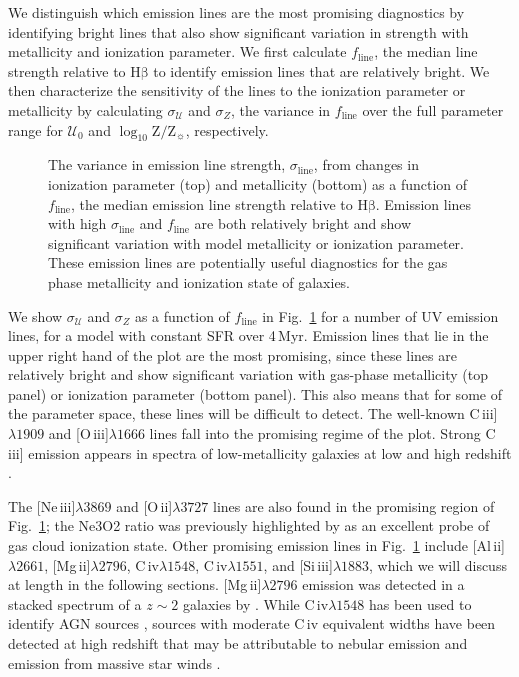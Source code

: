 \documentclass[preprint2]{aastex61}
\newcommand{\oiii}{[O\,{\sc iii}]\xspace}
\newcommand{\oii}{[O\,{\sc ii}]\xspace}
\newcommand{\neiii}{[Ne\,{\sc iii}]\xspace}
\newcommand{\civ}{C\,{\sc iv}\xspace}
\newcommand{\SiuIII}{[Si\,{\sc iii}]\xspace}
\newcommand{\alII}{[Al\,{\sc ii}]\xspace}
\newcommand{\mgii}{[Mg\,{\sc ii}]\xspace}
\newcommand{\ciii}{C\,{\sc iii}]\xspace}
\newcommand{\sigmaL}{\ensuremath{\sigma_{\mathrm{line}}}\xspace}
\newcommand{\sigmaU}{\ensuremath{\sigma_{\mathcal{U}}}\xspace}
\newcommand{\sigmaZ}{\ensuremath{\sigma_{Z}}\xspace}
\newcommand{\femline}{\ensuremath{f_{\mathrm{line}}}\xspace}
\newcommand{\hb}{\ensuremath{\mathrm{H\beta}}\xspace}
\newcommand{\Myr}{$\,$Myr\xspace}
\newcommand{\logten}{\ensuremath{\log_{10}}}
\newcommand{\logz}{\ensuremath{\logten \mathrm{Z}/\mathrm{Z}_{\sun}}\xspace}
\newcommand{\U}{\ensuremath{\mathcal{U}_{0}}\xspace}
\begin{document}
We distinguish which emission lines are the most promising diagnostics by identifying bright lines that also show significant variation in strength with metallicity and ionization parameter. We first calculate \femline, the median line strength relative to \hb to identify emission lines that are relatively bright. 
We then characterize the sensitivity of the lines to the ionization parameter or metallicity by calculating \sigmaU and \sigmaZ, the variance in \femline over the full parameter range for \U and \logz, respectively. 
\begin{figure}
  \begin{center}
    \caption{The variance in emission line strength, \sigmaL, from changes in ionization parameter (top) and metallicity (bottom) as a function of \femline, the median emission line strength relative to \hb. Emission lines with high \sigmaL and \femline are both relatively bright and show significant variation with model metallicity or ionization parameter. These emission lines are potentially useful diagnostics for the gas phase metallicity and ionization state of galaxies.}
    \label{fig:sigmaV}
  \end{center}
\end{figure}


We show \sigmaU and \sigmaZ as a function of \femline in Fig.~\ref{fig:sigmaV} for a number of UV emission lines, for a model with constant SFR over 4\Myr. Emission lines that lie in the upper right hand of the plot are the most promising, since these lines are relatively bright and show significant variation with gas-phase metallicity (top panel) or ionization parameter (bottom panel). This also means that for some of the parameter space, these lines will be difficult to detect. The well-known \ciii$\lambda1909$ and \oiii$\lambda1666$ lines fall into the promising regime of the plot. Strong \ciii emission appears in spectra of low-metallicity galaxies at low and high redshift \citep[e.g.,][]{Shapley+2003, Erb+2010, Leitherer+2011, Bayliss+2014, Stark+2014, Stark+2015, Berg+2016, Senchyna+2017, Stroe+2017a}.

The \neiii$\lambda3869$ and \oii$\lambda3727$ lines are also found in the promising region of Fig.~\ref{fig:sigmaV}; the Ne3O2 ratio was previously highlighted by \citet{Levesque+2014} as an excellent probe of gas cloud ionization state. Other promising emission lines in Fig.~\ref{fig:sigmaV} include \alII$\lambda2661$, \mgii$\lambda2796$, \civ$\lambda1548$, \civ$\lambda1551$, and \SiuIII$\lambda1883$, which we will discuss at length in the following sections. \mgii$\lambda2796$ emission was detected in a stacked spectrum of a $z{\sim}2$ galaxies by \citet{Du+2016}. While \civ$\lambda1548$ has been used to identify AGN sources \citep{Stroe+2017b, Feltre+2016}, sources with moderate \civ equivalent widths have been detected at high redshift that may be attributable to nebular emission and emission from massive star winds \citep{Stark+2014, Mainali+2017, Schmidt+2017}.
\end{document}
